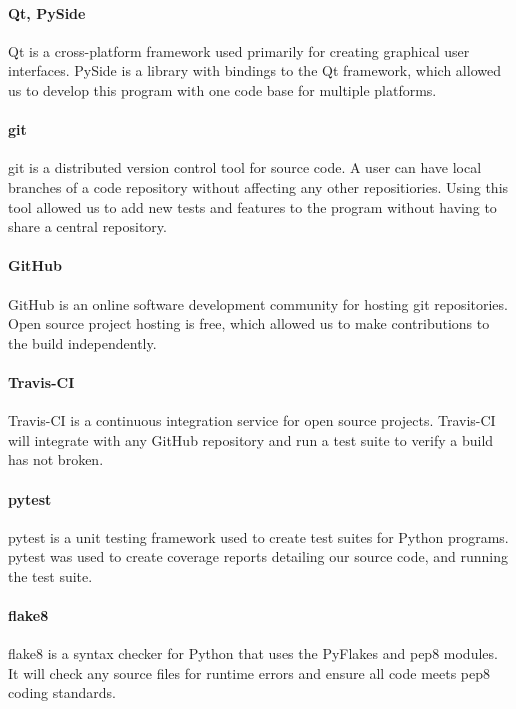 \documentclass{bioinfo}
\begin{document}
\paragraph{Qt, PySide\textcolon}
Qt is a cross-platform framework used primarily for creating graphical user interfaces. PySide is a library with bindings to the Qt framework, which allowed us to develop this program with one code base for multiple platforms.

\paragraph{git\textcolon} 
git is a distributed version control tool for source code. A user can have local branches of a code repository without affecting any other repositiories. Using this tool allowed us to add new tests and features to the program without having to share a central repository.

\paragraph{GitHub\textcolon} 
GitHub is an online software development community for hosting git repositories. Open source project hosting is free, which allowed us to make contributions to the build independently.
    
\paragraph{Travis-CI\textcolon}
Travis-CI is a continuous integration service for open source projects. Travis-CI will integrate with any GitHub repository and run a test suite to verify a build has not broken.

\paragraph{pytest\textcolon} 
pytest is a unit testing framework used to create test suites for Python programs. pytest was used to create coverage reports detailing our source code, and running the test suite.

\paragraph{flake8\textcolon} 
flake8 is a syntax checker for Python that uses the PyFlakes and pep8 modules. It will check any source files for runtime errors and ensure all code meets pep8 coding standards.
    
\end{document}
